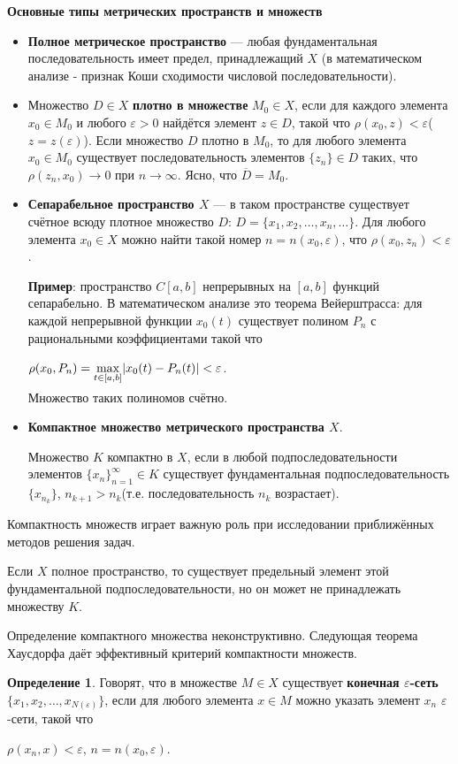 \documentclass[12pt,a4paper,titlepage]{book}
\theoremstyle{definition}
\newtheorem{definition}{Определение}
\theoremstyle{plain}
\theoremstyle{remark}
\theoremstyle{plain}
\begin{document}
\begin{large}
\textbf{Основные типы метрических пространств и множеств}
\end{large}
\begin{itemize}
\item \textbf{Полное метрическое пространство} --- любая фундаментальная последовательность имеет предел, принадлежащий $X$ (в математическом анализе - признак Коши сходимости числовой последовательности).
\item Множество $D\in X$ \textbf{плотно в множестве} $ M_0 \in X$, если для каждого элемента $x_0 \in M_0$ и любого $\varepsilon>0$ найдётся элемент $z \in D$, такой что $\rho(x_0, z)<\varepsilon$($z=z(\varepsilon)$). Если множество $D$ плотно в $M_0$, то для любого элемента $x_0\in M_0$ существует последовательность элементов $\lbrace z_n \rbrace \in D$ таких, что $\rho(z_n, x_0)\rightarrow0$ при $n\rightarrow\infty$. Ясно, что $\overline{D}=M_0$.
\item \textbf{Сепарабельное пространство $X$} --- в таком пространстве существует счётное всюду плотное множество $D$: $D=\lbrace x_1,x_2,\ldots,x_n,\ldots \rbrace$. Для любого элемента $x_0 \in X$ можно найти такой номер $n=n(x_0,\varepsilon)$, что $\rho(x_0, z_n)<\varepsilon$.

\textbf{Пример}: пространство $C[a,b]$ непрерывных на $[a,b]$ функций сепарабельно. В математическом анализе это теорема Вейерштрасса: для каждой непрерывной функции $x_0(t)$ существует полином $P_n$ с рациональными коэффициентами такой что
\begin{center}
 $\rho(x_0, P_n)=\smash{\displaystyle\max_{t \in [a,b]}} |x_0(t)-P_n(t)| <\varepsilon$.
\end{center}
Множество таких полиномов счётно.
\item \textbf{Компактное множество метрического пространства $X$}.

Множество $K$ компактно в $X$, если в любой подпоследовательности элементов $\lbrace x_n \rbrace_{n=1}^{\infty} \in K$ существует фундаментальная подпоследовательность $\lbrace x_{n_k} \rbrace$, $n_{k+1}>n_k$(т.е. последовательность $n_k$ возрастает).
\end{itemize}

	Компактность множеств играет важную роль при исследовании приближённых методов решения задач.
\par Если $X$ полное пространство, то существует предельный элемент этой фундаментальной подпоследовательности, но он может не принадлежать множеству $K$.
\par Определение компактного множества неконструктивно. Следующая теорема Хаусдорфа даёт эффективный критерий компактности множеств.
\begin{definition}
Говорят, что в множестве $M \in X$ существует \textbf{конечная $\varepsilon$-сеть$\lbrace x_1,x_2,\ldots,x_{N(\varepsilon)} \rbrace$}, если для любого элемента $x \in M$ можно указать элемент $x_n$ $\varepsilon$-сети, такой что
\begin{center}
 $\rho(x_n, x) <\varepsilon$, $n=n(x_0,\varepsilon)$.
\end{center}
\end{definition}
\end{document}
